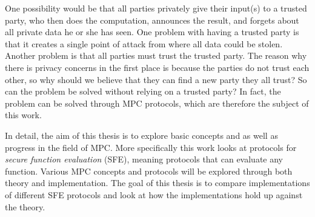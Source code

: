 One possibility would be that all parties privately give their input(s) to a trusted party, who then does the computation, announces the result, and forgets about all private data he or she has seen. One problem with having a trusted party is that it creates a single point of attack from where all data could be stolen. Another problem is that all parties must trust the trusted party. The reason why there is privacy concerns in the first place is because the parties do not trust each other, so why should we believe that they can find a new party they all trust? So can the problem be solved without relying on a trusted party? In fact, the problem can be solved through MPC protocols, which are therefore the subject of this work.


In detail, the aim of this thesis is to explore basic concepts and as well as progress in the field of MPC. More specifically this work looks at protocols for \emph{secure function evaluation} (SFE), meaning protocols that can evaluate any function. Various MPC concepts and protocols will be explored through both theory and implementation. The goal of this thesis is to compare implementations of different SFE protocols and look at how the implementations hold up against the theory. 